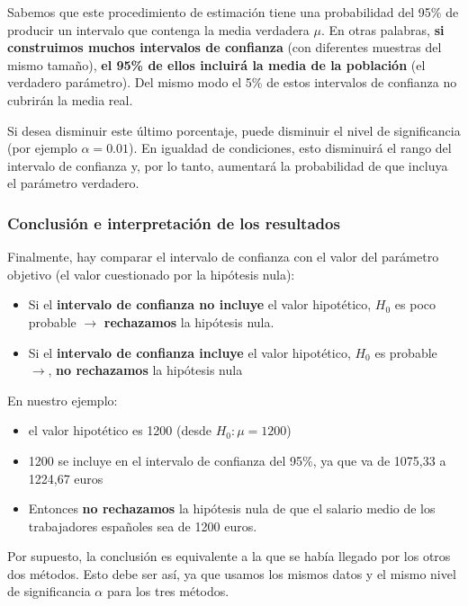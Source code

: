 \documentclass[
]{book}
\providecommand{\tightlist}{%
  \setlength{\itemsep}{0pt}\setlength{\parskip}{0pt}}
\begin{document}
Sabemos que este procedimiento de estimación tiene una probabilidad del 95\% de producir un intervalo que contenga la media verdadera \(\mu\). En otras palabras, \textbf{si construimos muchos intervalos de confianza} (con diferentes muestras del mismo tamaño), \textbf{el 95\% de ellos incluirá la media de la población} (el verdadero parámetro). Del mismo modo el 5\% de estos intervalos de confianza no cubrirán la media real.

Si desea disminuir este último porcentaje, puede disminuir el nivel de significancia (por ejemplo \(\alpha= 0.01\)). En igualdad de condiciones, esto disminuirá el rango del intervalo de confianza y, por lo tanto, aumentará la probabilidad de que incluya el parámetro verdadero.

\hypertarget{conclusiuxf3n-e-interpretaciuxf3n-de-los-resultados-1}{%
\subsubsection{Conclusión e interpretación de los resultados}\label{conclusiuxf3n-e-interpretaciuxf3n-de-los-resultados-1}}

Finalmente, hay comparar el intervalo de confianza con el valor del parámetro objetivo (el valor cuestionado por la hipótesis nula):

\begin{itemize}
\tightlist
\item
  Si el \textbf{intervalo de confianza no incluye} el valor hipotético, \(H_0\) es poco probable \(\rightarrow\) \textbf{rechazamos} la hipótesis nula.
\item
  Si el \textbf{intervalo de confianza incluye} el valor hipotético, \(H_0\) es probable \(\rightarrow\), \textbf{no rechazamos} la hipótesis nula
\end{itemize}

En nuestro ejemplo:

\begin{itemize}
\tightlist
\item
  el valor hipotético es 1200 (desde \(H_0:\mu= 1200\))
\item
  1200 se incluye en el intervalo de confianza del 95\%, ya que va de 1075,33 a 1224,67 euros
\item
  Entonces \textbf{no rechazamos} la hipótesis nula de que el salario medio de los trabajadores españoles sea de 1200 euros.
\end{itemize}

Por supuesto, la conclusión es equivalente a la que se había llegado por los otros dos métodos. Esto debe ser así, ya que usamos los mismos datos y el mismo nivel de significancia \(\alpha\) para los tres métodos.
\end{document}
